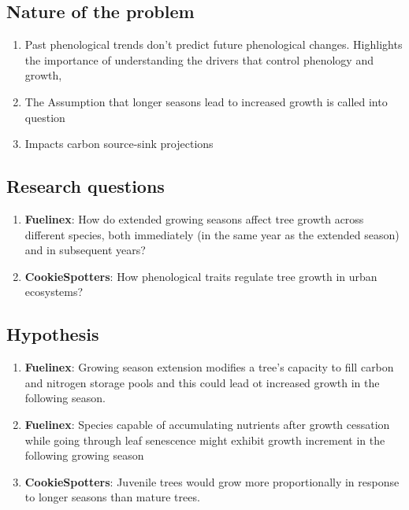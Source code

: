 \documentclass{article}
\begin{document}
\subsection*{Nature of the problem} 
\begin{enumerate}
	\item Past phenological trends don't predict future phenological changes. Highlights the importance of understanding the drivers that control phenology and growth,
	\item The Assumption that longer seasons lead to increased growth is called into question
	\item Impacts carbon source-sink projections
\end{enumerate}

\subsection *{Research questions}
\begin {enumerate}
	\item \textbf{Fuelinex}: How do extended growing seasons affect tree growth across different species, both immediately (in the same year as the extended season) and in subsequent years?
	\item \textbf {CookieSpotters}: How phenological traits regulate tree growth in urban ecosystems?
\end {enumerate}

\subsection *{Hypothesis}
\begin {enumerate}
	\item \textbf{Fuelinex}:  Growing season extension modifies a tree’s capacity to fill carbon and nitrogen storage pools and this could lead ot increased growth in the following season.
	\item \textbf{Fuelinex}: Species capable of accumulating nutrients after growth cessation while going through leaf senescence might exhibit growth increment in the following growing season
	\item \textbf{CookieSpotters}: Juvenile trees would grow more proportionally in response to longer seasons than mature trees.
\end {enumerate}
\end{document}
